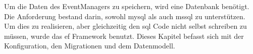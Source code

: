 


Um die Daten des EventManagers zu speichern, wird eine Datenbank benötigt. Die Anforderung bestand darin, sowohl \gls{mysql} als auch \gls{mssql} zu unterstützen. Um dies zu realisieren, aber gleichzeitig den \gls{sql} Code nicht selbst schreiben zu müssen, wurde das \gls{ef} Framework benutzt. Dieses Kapitel befasst sich mit der Konfiguration, den Migrationen und dem Datenmodell.
